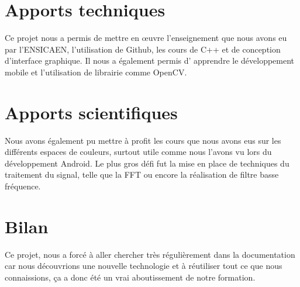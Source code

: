 \section{Apports techniques}

Ce projet nous a permis de mettre en œuvre l'enseignement que nous avons eu par l'ENSICAEN, l'utilisation de Github, les cours de C++ et de conception d'interface graphique. Il nous a également permis d'
apprendre le développement mobile et l'utilisation de librairie comme OpenCV. 

\section{Apports scientifiques}

Nous avons également pu mettre à profit les cours que nous avons eus sur les différents espaces de couleurs, surtout utile comme nous l'avons vu lors du développement Android. Le plus gros défi fut la mise
en place de techniques du traitement du signal, telle que la FFT ou encore la réalisation de filtre basse fréquence. 

\section{Bilan}

Ce projet, nous a forcé à aller chercher très régulièrement dans la documentation car nous découvrions une nouvelle technologie et à réutiliser tout ce que nous connaissions, ça a donc été un vrai 
aboutissement de notre formation.
